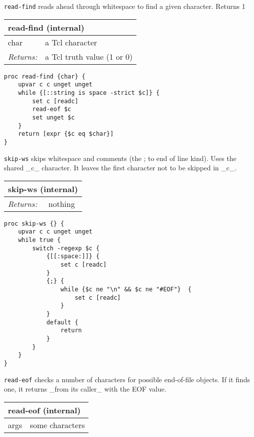 \documentclass{report}
\begin{document}
\texttt{read-find} reads ahead through whitespace to find a given character. Returns 1

\begin{tabular}{ |l l| }
\hline
\multicolumn{2}{|l|}{read-find (internal)} \\
\hline
char & a Tcl character \\
\textit{Returns:} & a Tcl truth value (1 or 0) \\
\hline
\end{tabular}

\noindent\makebox[\linewidth]{\rule{\linewidth}{0.4pt}}
\begin{lstlisting}
proc read-find {char} {
    upvar c c unget unget
    while {[::string is space -strict $c]} {
        set c [readc]
        read-eof $c
        set unget $c
    }
    return [expr {$c eq $char}]
}
\end{lstlisting}
\noindent\makebox[\linewidth]{\rule{\linewidth}{0.4pt}}

\texttt{skip-ws} skips whitespace and comments (the ; to end of line kind). Uses the shared \_c\_ character. It leaves the first character not to be skipped in \_c\_.

\begin{tabular}{ |l l| }
\hline
\multicolumn{2}{|l|}{skip-ws (internal)} \\
\hline
\textit{Returns:} & nothing \\
\hline
\end{tabular}

\noindent\makebox[\linewidth]{\rule{\linewidth}{0.4pt}}
\begin{lstlisting}
proc skip-ws {} {
    upvar c c unget unget
    while true {
        switch -regexp $c {
            {[[:space:]]} {
                set c [readc]
            }
            {;} {
                while {$c ne "\n" && $c ne "#EOF"}  {
                    set c [readc]
                }
            }
            default {
                return
            }
        }
    }
}
\end{lstlisting}
\noindent\makebox[\linewidth]{\rule{\linewidth}{0.4pt}}

\texttt{read-eof} checks a number of characters for possible end-of-file objects. If it finds one, it returns \_from its caller\_ with the EOF value.

\begin{tabular}{ |l l| }
\hline
\multicolumn{2}{|l|}{read-eof (internal)} \\
\hline
args & some characters \\
\hline
\end{tabular}
\end{document}
